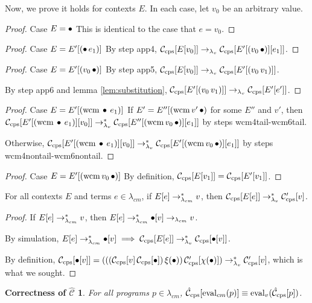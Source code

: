 Now, we prove it holds for contexts $E$. In each case, let $v_0$ be an arbitrary value.
\begin{proof}{Case $E=\hole$}
This is identical to the case that $e=v_0$.
\end{proof}

\begin{proof}{Case $E=E'[\app{\hole}{e_1}]$}
By step app4, $\Ccps{E[v_0]}\lvrr\Ccps{E'[\app{v_0}{\hole}][e_1]}$.
\end{proof}

\begin{proof}{Case $E=E'[\app{v_0}{\hole}]$}
By step app5, $\Ccps{E[v_0]}\lvrr\Ccps{E'[\app{v_0}{v_1}]}$.

By step app6 and lemma \ref{lem:substitution}, $\Ccps{E'[\app{v_0}{v_1}]}\lvrr\Ccps{E'[e']}$.
\end{proof}

\begin{proof}{Case $E=E'[\wcm{\hole}{e_1}]$}
If $E'=E''[\wcm{v'}{\hole}$ for some $E''$ and $v'$, then $\Ccps{E'[\wcm{\hole}{e_1}][v_0]}\lvrrs\Ccps{E''[\wcm{v_0}{\hole}][e_1]}$ by steps wcm4tail-wcm6tail.

Otherwise, $\Ccps{E'[\wcm{\hole}{e_1}][v_0]}\lvrrs\Ccps{E'[\wcm{v_0}{\hole}][e_1]}$ by steps wcm4nontail-wcm6nontail.
\end{proof}

\begin{proof}{Case $E=E'[\wcm{v_0}{\hole}]$}
By definition, $\Ccps{E[v_1]}=\Ccps{E'[v_1]}$.
\end{proof}

\begin{lemma}
\label{lem:great}
For all contexts $E$ and terms $e\in\lambda_{cm}$, if $E[e]\cmrrs v$, then $\Ccps{E[e]}\lvrrs\Cpcps{v}$.
\end{lemma}

\begin{proof}
If $E[e]\cmrrs v$, then $E[e]\cmrrs\hole[v]\cmrr v$.

By simulation, $E[e]\cmrrs\hole[v]\implies\Ccps{E[e]}\lvrrs\Ccps{\hole[v]}$.

By definition, $\Ccps{\hole[v]}=\app{\app{\app{\Ccps{v}}{\Ccps{\hole}}}{\xi(\hole)}}{\Cpcps{\chi(\hole)}}\lvrrs\Cpcps{v}$, which is what we sought.
\end{proof}

\newtheorem*{maintheorem}{Correctness of $\hat{\mathcal{C}}$}
\begin{maintheorem}
For all programs $p\in\lambda_{cm}$, $\Chcps{\mathrm{eval}_{cm}(p)}\equiv\mathrm{eval}_{v}(\Chcps{p})$.
\end{maintheorem}

